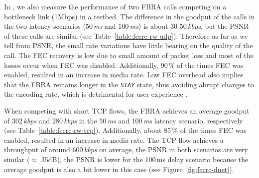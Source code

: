 In , we also measure the performance of two FBRA calls
competing on a bottleneck link (1Mbps) in a testbed. The difference in the
goodput of the calls in the two latency scenarios (50\,\emph{ms} and
100\,\emph{ms}) is about 30-50\,\emph{kbps}, but the PSNR of these calls are
similar (see Table~\ref{table:fecrc-rw-udp}). Therefore as far as we tell from
PSNR, the small rate variations have little bearing on the quality of the
call. The FEC recovery is low due to small amount of packet loss and most of
the losses occur when FEC was disabled. Additionally, 90\,\% of the times FEC
was enabled, resulted in an increase in media rate. Low FEC overhead also
implies that the FBRA remains longer in the \texttt{\emph{STAY}} state, thus
avoiding abrupt changes to the encoding rate, which is detrimental for user
experience \cite{Zink03subjectiveimpression}.

\begin{table}
  \caption{An RTP flow sharing a bottleneck link with short TCP flows in an
  emulated testbed. Results are average of 10 runs.}
  \label{table:fecrc-rw-tcp}
\end{table}


When competing with short TCP flows, the FBRA achieves an average goodput of
302\,\emph{kbps} and 280\,\emph{kbps} in the 50\,\emph{ms} and 100\,\emph{ms}
latency scenario, respectively (see Table~\ref{table:fecrc-rw-tcp}).
Additionally, about 85\,\% of the times FEC was enabled, resulted in an
increase in media rate. The TCP flow achieves a throughput of around
600\,\emph{kbps} on average, the PSNR in both scenarios are very similar
($\approx$ 35dB), the PSNR is lower for the 100\,ms delay scenario because the
average goodput is also a bit lower in this case (see Figure~\ref{fig:fecrc-dnet}).


